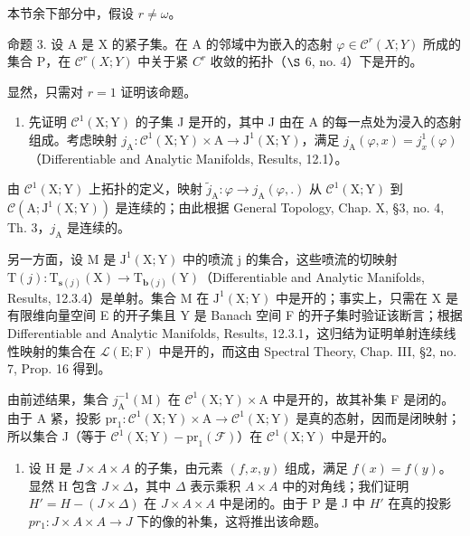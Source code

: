 本节余下部分中，假设 \(r \neq \omega\)。

命题 3. 设 A 是 X 的紧子集。在 A 的邻域中为嵌入的态射 \(\varphi \in \mathcal{C}^{r}(X;Y)\) 所成的集合 P，在 \(\mathcal{C}^{r}(X;Y)\) 中关于紧 \(C^{r}\) 收敛的拓扑（\(\S\) 6, no. 4）下是开的。

显然，只需对 \(r = 1\) 证明该命题。

\begin{enumerate}
\def\labelenumi{\alph{enumi})}
\tightlist
\item
  先证明 \(\mathcal{C}^{1}(\mathrm{X};\mathrm{Y})\) 的子集 J 是开的，其中 J 由在 A 的每一点处为浸入的态射组成。考虑映射 \(j_{\mathrm{A}}:\mathcal{C}^{1}(\mathrm{X};\mathrm{Y})\times\mathrm{A}\to\mathrm{J}^{1}(\mathrm{X};\mathrm{Y})\)，满足 \(j_{\mathrm{A}}(\varphi,x)=j_{x}^{1}(\varphi)\)（Differentiable and Analytic Manifolds, Results, 12.1）。
\end{enumerate}

由 \(\mathcal{C}^1 (\mathrm{X};\mathrm{Y})\) 上拓扑的定义，映射 \(\tilde{j}_{\mathrm{A}}:\varphi \to j_{\mathrm{A}}(\varphi ,.)\) 从 \(\mathcal{C}^1 (\mathrm{X};\mathrm{Y})\) 到 \(\mathcal{C}(\mathrm{A};\mathrm{J}^1 (\mathrm{X};\mathrm{Y}))\) 是连续的；由此根据 General Topology, Chap. X, §3, no. 4, Th. 3，\(j_{\mathrm{A}}\) 是连续的。

另一方面，设 M 是 \(\mathrm{J}^{1}(\mathrm{X};\mathrm{Y})\) 中的喷流 j 的集合，这些喷流的切映射 \(\mathrm{T}(j):\mathrm{T}_{\mathbf{s}(j)}(\mathrm{X})\to\mathrm{T}_{\mathbf{b}(j)}(\mathrm{Y})\)（Differentiable and Analytic Manifolds, Results, 12.3.4）是单射。集合 M 在 \(\mathrm{J}^{1}(\mathrm{X};\mathrm{Y})\) 中是开的；事实上，只需在 X 是有限维向量空间 E 的开子集且 Y 是 Banach 空间 F 的开子集时验证该断言；根据 Differentiable and Analytic Manifolds, Results, 12.3.1，这归结为证明单射连续线性映射的集合在 \(\mathcal{L}(\mathrm{E};\mathrm{F})\) 中是开的，而这由 Spectral Theory, Chap. III, §2, no. 7, Prop. 16 得到。

由前述结果，集合 \(j_{\mathrm{A}}^{-1}(\mathrm{M})\) 在 \(\mathcal{C}^{1}(\mathrm{X};\mathrm{Y})\times\mathrm{A}\) 中是开的，故其补集 F 是闭的。由于 A 紧，投影 \(\mathrm{pr}_{1}:\mathcal{C}^{1}(\mathrm{X};\mathrm{Y})\times\mathrm{A}\to\mathcal{C}^{1}(\mathrm{X};\mathrm{Y})\) 是真的态射，因而是闭映射；所以集合 J（等于 \(\mathcal{C}^{1}(\mathrm{X};\mathrm{Y})-\mathrm{pr}_{1}(\mathcal{F})\)）在 \(\mathcal{C}^{1}(\mathrm{X};\mathrm{Y})\) 中是开的。

\begin{enumerate}
\def\labelenumi{\alph{enumi})}
\setcounter{enumi}{1}
\tightlist
\item
  设 H 是 \(J \times A \times A\) 的子集，由元素 \((f, x, y)\) 组成，满足 \(f(x) = f(y)\)。显然 H 包含 \(J \times \Delta\)，其中 \(\Delta\) 表示乘积 \(A \times A\) 中的对角线；我们证明 \(H' = H - (J \times \Delta)\) 在 \(J \times A \times A\) 中是闭的。由于 P 是 J 中 \(H'\) 在真的投影 \(pr_{1}: J \times A \times A \to J\) 下的像的补集，这将推出该命题。
\end{enumerate}


